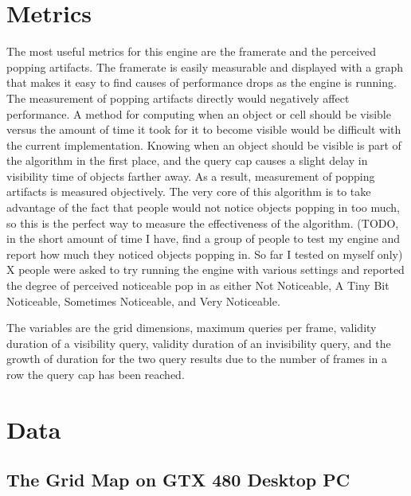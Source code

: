 \documentclass[12pt]{ucthesis}
\newcommand{\captionfonts}{\small\bf\ssp}
\begin{document}
\section {Metrics}
\label{metrics}

The most useful metrics for this engine are the framerate and the perceived popping artifacts.
The framerate is easily measurable and displayed with a graph that makes it easy to find causes of performance drops as the engine is running.
The measurement of popping artifacts directly would negatively affect performance.
A method for computing when an object or cell should be visible versus the amount of time it took for it to become visible would be difficult with the current implementation.
Knowing when an object should be visible is part of the algorithm in the first place, and the query cap causes a slight delay in visibility time of objects farther away.
As a result, measurement of popping artifacts is measured objectively.
The very core of this algorithm is to take advantage of the fact that people would not notice objects popping in too much, so this is the perfect way to measure the effectiveness of the algorithm.
(TODO, in the short amount of time I have, find a group of people to test my engine and report how much they noticed objects popping in.  So far I tested on myself only)
X people were asked to try running the engine with various settings and reported the degree of perceived noticeable pop in as either Not Noticeable, A Tiny Bit Noticeable, Sometimes Noticeable, and Very Noticeable.


The variables are the grid dimensions, maximum queries per frame, validity duration of a visibility query, validity duration of an invisibility query, and the growth of duration for the two query results due to the number of frames in a row the query cap has been reached.

\section {Data}
\label{data}

\subsection {The Grid Map on GTX 480 Desktop PC}
\label{the-grid-gtx-480}
\end{document}
